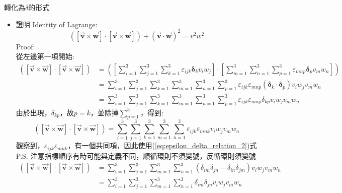 \documentclass[../main.tex]{subfiles}
\begin{document}
\begin{itemize}
\begin{enumerate}
    轉化為$\delta$的形式
  \end{enumerate}
  \begin{itemize}
    \item 證明 Identity of Lagrange:
      \begin{equation}
        \left(
          [\vec {\bm v} \times \vec {\bm w}] \cdot [\vec {\bm v} \times \vec {\bm w}]
        \right) + \left( \vec {\bm v} \cdot \vec {\bm w} \right)^2 = v^2w^2
      \end{equation}
      Proof:\\
      從左邊第一項開始:
      \begin{align}
        \left(
          [\vec {\bm v} \times \vec {\bm w}] \cdot [\vec {\bm v} \times \vec {\bm w}]
        \right) & = \left(
          [\sum_{i=1}^3 \sum_{j=1}^3 \sum_{k=1}^3 \varepsilon_{ijk} \bm \delta_k v_i w_j] \cdot
          [\sum_{m=1}^3 \sum_{n=1}^3 \sum_{p=1}^3 \varepsilon_{mnp} \bm \delta_p v_m w_n]
        \right) \nonumber\\
        &= \sum_{i=1}^3 \sum_{j=1}^3 \sum_{k=1}^3 \sum_{m=1}^3 \sum_{n=1}^3 \sum_{p=1}^3
        \varepsilon_{ijk} \varepsilon_{mnp} (\bm \delta_k \cdot \bm \delta_p) v_i w_j v_m w_n \nonumber\\
        &= \sum_{i=1}^3 \sum_{j=1}^3 \sum_{k=1}^3 \sum_{m=1}^3 \sum_{n=1}^3 \sum_{p=1}^3
        \varepsilon_{ijk} \varepsilon_{mnp} \delta_{kp} v_i w_j v_m w_n
      \end{align}
      由於出現，$\delta_{kp}$，故$p=k$，並除掉$\sum_{p=1}^3$，得到:
      \begin{equation}
        \left(
          [\vec {\bm v} \times \vec {\bm w}] \cdot [\vec {\bm v} \times \vec {\bm w}]
        \right) = \sum_{i=1}^3 \sum_{j=1}^3 \sum_{k=1}^3 \sum_{m=1}^3 \sum_{n=1}^3
        \varepsilon_{ijk} \varepsilon_{mnk} v_i w_j v_m w_n 
      \end{equation}
      觀察到，$\varepsilon_{ijk} \varepsilon_{mnk}$，有一個共同項，因此使用(\ref{eq:epsilon_delta_relation_2})式\\
      P.S. 注意指標順序有時可能與定義不同，順循環則不須變號，反循環則須變號
      \begin{align}
        \left(
          [\vec {\bm v} \times \vec {\bm w}] \cdot [\vec {\bm v} \times \vec {\bm w}]
        \right) &= \sum_{i=1}^3 \sum_{j=1}^3 \sum_{m=1}^3 \sum_{n=1}^3
        \left(
          \delta_{im}\delta_{jn} - \delta_{in}\delta_{jm}
        \right) v_i w_j v_m w_n \nonumber\\
        &= \sum_{i=1}^3 \sum_{j=1}^3 \sum_{m=1}^3 \sum_{n=1}^3 \delta_{im}\delta_{jn} v_i w_j v_m w_n

\end{align}
\end{itemize}
\end{itemize}
\end{document}
